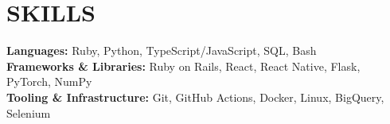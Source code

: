 \section{\textbf {\large SKILLS}}
\begin{itemize}[leftmargin=0.15in, label={}]
	\footnotesize{\item{
	      \textbf{Languages:} Ruby, Python, TypeScript/JavaScript, SQL, Bash \\
	      \textbf{Frameworks \& Libraries:} Ruby on Rails, React, React Native, Flask, PyTorch, NumPy \\
	      \textbf{Tooling \& Infrastructure:} Git, GitHub Actions, Docker, Linux, BigQuery, Selenium \\
	      }}
\end{itemize}
